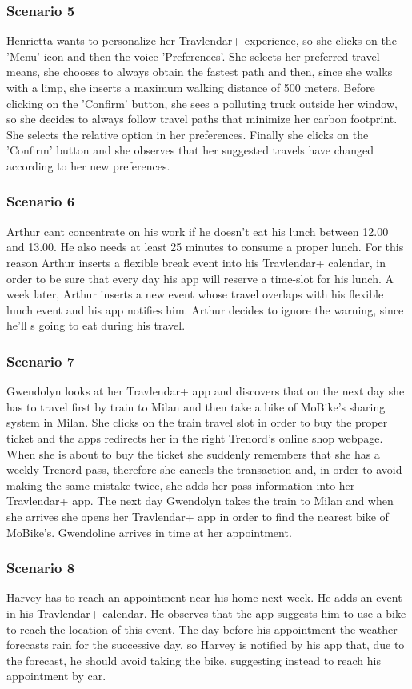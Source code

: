 	\subsubsection{Scenario 5}
		Henrietta wants to personalize her Travlendar+ experience, so she clicks on the 'Menu' icon and then the voice 'Preferences'. She selects her preferred travel means, she chooses to always obtain the fastest path and then, since she walks with a limp, she inserts a maximum walking distance of 500 meters. Before clicking on the 'Confirm' button, she sees a polluting truck outside her window, so she decides to always follow travel paths that minimize her carbon footprint. She selects the relative option in her preferences. Finally she clicks on the 'Confirm' button and she observes that her suggested travels have changed according to her new preferences.
	\subsubsection{Scenario 6}
		Arthur can\textsc{}t concentrate on his work if he doesn't eat his lunch between 12.00 and 13.00. He also needs at least 25 minutes to consume a proper lunch.
For this reason Arthur inserts a flexible break event into his Travlendar+ calendar, in order to be sure that every day his app will reserve a time-slot for his lunch.
A week later, Arthur inserts a new event whose travel overlaps with his flexible lunch event and his app notifies him. Arthur decides to ignore the warning, since he'll s going to eat during his travel.
	\subsubsection{Scenario 7}
		Gwendolyn looks at her Travlendar+ app and discovers that on the next day she has to travel first by train to Milan and then take a bike of MoBike’s sharing system in Milan. She clicks on the train travel slot in order to buy the proper ticket and the apps redirects her in the right Trenord’s online shop webpage. When she is about to buy the ticket she suddenly remembers that she has a weekly Trenord pass, therefore she cancels the transaction and, in order to avoid making the same mistake twice, she adds her pass information into her Travlendar+ app. The next day Gwendolyn takes the train to Milan and when she arrives she opens her Travlendar+ app in order to find the nearest bike of MoBike’s. Gwendoline arrives in time at her appointment.
	\subsubsection{Scenario 8}
		Harvey has to reach an appointment near his home next week. He adds an event in his Travlendar+ calendar. He observes that the app suggests him to use a bike to reach the location of this event. The day before his appointment the weather forecasts rain for the successive day, so Harvey is notified by his app that, due to the forecast, he should avoid taking the bike, suggesting instead to reach his appointment by car.
